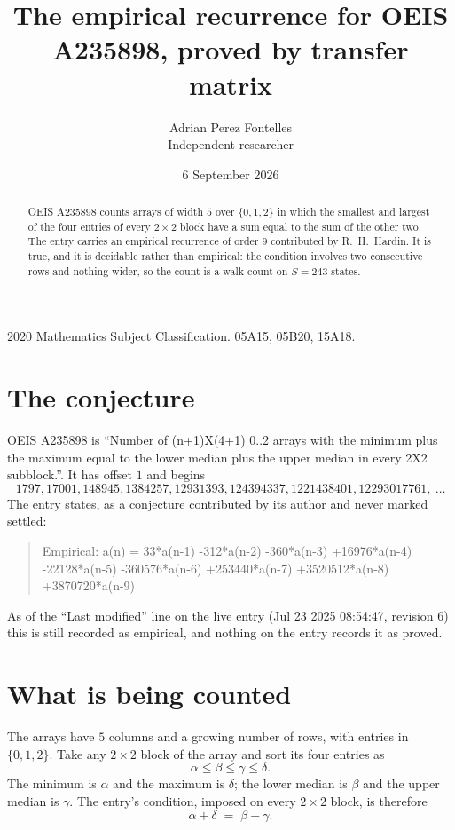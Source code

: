 \documentclass[11pt,a4paper]{article}
\title{The empirical recurrence for OEIS A235898, proved by transfer matrix}
\author{Adrian Perez Fontelles\\ \small Independent researcher}
\date{6 September 2026}
\theoremstyle{plain}
\theoremstyle{definition}
\begin{document}
\maketitle

\begin{abstract}
OEIS A235898 counts arrays of width $5$ over $\{0,1,2\}$ in which the smallest and largest of the
four entries of every $2\times2$ block have a sum equal to the sum of the other two. The entry
carries an empirical recurrence of order $9$ contributed by R.~H.~Hardin. It is true, and
it is decidable rather than empirical: the condition involves two consecutive rows and nothing
wider, so the count is a walk count on $S=243$ states.
\end{abstract}

\noindent\small 2020 Mathematics Subject Classification. 05A15, 05B20, 15A18.\normalsize

\section{The conjecture}

OEIS A235898 is ``Number of (n+1)X(4+1) 0..2 arrays with the minimum plus the maximum equal to the lower median plus the upper median in every 2X2 subblock.''. It has offset $1$ and begins
\[
1797, 17001, 148945, 1384257, 12931393, 124394337, 1221438401, 12293017761,\ \dots
\]
The entry states, as a conjecture contributed by its author and never marked settled:
\begin{quote}
Empirical: a(n) = 33*a(n-1) -312*a(n-2) -360*a(n-3) +16976*a(n-4) -22128*a(n-5) -360576*a(n-6) +253440*a(n-7) +3520512*a(n-8) +3870720*a(n-9)
\end{quote}
As of the ``Last modified'' line on the live entry (Jul 23 2025 08:54:47, revision 6) this is still
recorded as empirical, and nothing on the entry records it as proved.

\section{What is being counted}

The arrays have $5$ columns and a growing number of rows, with entries in $\{0,1,2\}$. Take any
$2\times2$ block of the array and sort its four entries as
\[
\alpha\le\beta\le\gamma\le\delta .
\]
The minimum is $\alpha$ and the maximum is $\delta$; the lower median is $\beta$ and the upper
median is $\gamma$. The entry's condition, imposed on every $2\times2$ block, is therefore
\[
\alpha+\delta\;=\;\beta+\gamma .
\]
\end{document}
